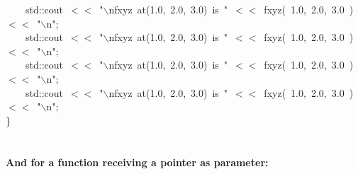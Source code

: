 \documentclass[9pt,onside,a4paper]{article}
\newcommand{\hlstd}[1]{\textcolor[rgb]{0.2,0,0.4}{#1}}
\newcommand{\hlnum}[1]{\textcolor[rgb]{0.2,0.73,0.02}{#1}}
\newcommand{\hlesc}[1]{\textcolor[rgb]{0.65,0.09,0.38}{#1}}
\newcommand{\hlstr}[1]{\textcolor[rgb]{0.09,0.38,0.65}{#1}}
\newcommand{\hlopt}[1]{\textcolor[rgb]{0.33,0.33,0.33}{#1}}
\newcommand{\hlkwd}[1]{\textcolor[rgb]{0.82,0.11,0.93}{#1}}
\begin{document}
{\hlstd{}\hlstd{\ \ \ \ }\hlstd{std}\hlopt{::}\hlstd{cout\ }\hlopt{$<$$<$\ }\hlstd{}\hlstr{"}\hlesc{$\backslash$n}\hlstr{fxyz\ at(1.0,\ 2.0,\ 3.0)\ is\ "}\hlstd{\ }\hlopt{$<$$<$\ }\hlstd{}\hlkwd{fxyz}\hlstd{}\hlopt{(\ }\hlstd{}\hlnum{1.0}\hlstd{}\hlopt{,\ }\hlstd{}\hlnum{2.0}\hlstd{}\hlopt{,\ }\hlstd{}\hlnum{3.0\ }\hlstd{}\hlopt{)\ $<$$<$\ }\hlstd{}\hlstr{"}\hlesc{$\backslash$n}\hlstr{"}\hlstd{}\hlopt{;}\hspace*{\fill}\\
\hlstd{}\hlstd{\ \ \ \ }\hlstd{std}\hlopt{::}\hlstd{cout\ }\hlopt{$<$$<$\ }\hlstd{}\hlstr{"}\hlesc{$\backslash$n}\hlstr{fxyz\ at(1.0,\ 2.0,\ 3.0)\ is\ "}\hlstd{\ }\hlopt{$<$$<$\ }\hlstd{}\hlkwd{fxyz}\hlstd{}\hlopt{(\ }\hlstd{}\hlnum{1.0}\hlstd{}\hlopt{,\ }\hlstd{}\hlnum{2.0}\hlstd{}\hlopt{,\ }\hlstd{}\hlnum{3.0\ }\hlstd{}\hlopt{)\ $<$$<$\ }\hlstd{}\hlstr{"}\hlesc{$\backslash$n}\hlstr{"}\hlstd{}\hlopt{;}\hspace*{\fill}\\
\hlstd{}\hlstd{\ \ \ \ }\hlstd{std}\hlopt{::}\hlstd{cout\ }\hlopt{$<$$<$\ }\hlstd{}\hlstr{"}\hlesc{$\backslash$n}\hlstr{fxyz\ at(1.0,\ 2.0,\ 3.0)\ is\ "}\hlstd{\ }\hlopt{$<$$<$\ }\hlstd{}\hlkwd{fxyz}\hlstd{}\hlopt{(\ }\hlstd{}\hlnum{1.0}\hlstd{}\hlopt{,\ }\hlstd{}\hlnum{2.0}\hlstd{}\hlopt{,\ }\hlstd{}\hlnum{3.0\ }\hlstd{}\hlopt{)\ $<$$<$\ }\hlstd{}\hlstr{"}\hlesc{$\backslash$n}\hlstr{"}\hlstd{}\hlopt{;}\hspace*{\fill}\\
\hlstd{}\hlstd{\ \ \ \ }\hlstd{std}\hlopt{::}\hlstd{cout\ }\hlopt{$<$$<$\ }\hlstd{}\hlstr{"}\hlesc{$\backslash$n}\hlstr{fxyz\ at(1.0,\ 2.0,\ 3.0)\ is\ "}\hlstd{\ }\hlopt{$<$$<$\ }\hlstd{}\hlkwd{fxyz}\hlstd{}\hlopt{(\ }\hlstd{}\hlnum{1.0}\hlstd{}\hlopt{,\ }\hlstd{}\hlnum{2.0}\hlstd{}\hlopt{,\ }\hlstd{}\hlnum{3.0\ }\hlstd{}\hlopt{)\ $<$$<$\ }\hlstd{}\hlstr{"}\hlesc{$\backslash$n}\hlstr{"}\hlstd{}\hlopt{;}\hspace*{\fill}\\
\hlstd{}\hlopt{\}}\hspace*{\fill}\\
\hlstd{}\hspace*{\fill}\\
}
\normalfont
\normalsize

\paragraph{And for a function receiving a pointer as parameter:\\}
\noindent
\ttfamily
\end{document}
